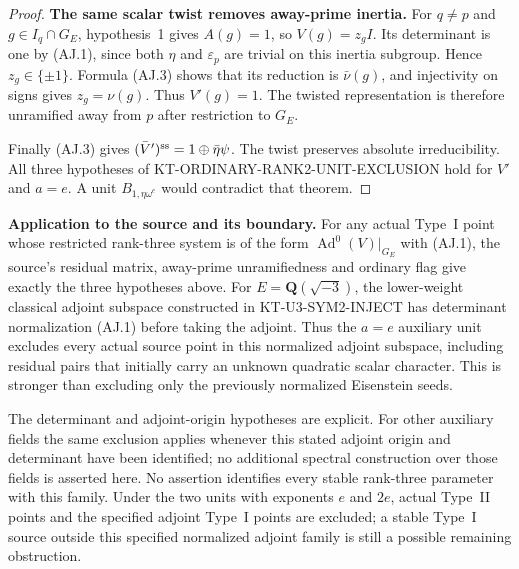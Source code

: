 \documentclass[11pt,a4paper]{article}
\theoremstyle{definition}
\renewcommand{\paragraph}[1]{\par\smallskip\noindent\textbf{#1}\quad\ignorespaces}
\begin{document}
\begin{proof}
\paragraph{The same scalar twist removes away-prime inertia.}
For $q\ne p$ and $g\in I_q\cap G_E$,
hypothesis~1 gives $A(g)=1$, so $V(g)=z_g I$.
Its determinant is one by (AJ.1), since both
$\eta$ and $\varepsilon_p$ are trivial on
this inertia subgroup.  Hence $z_g\in\{\pm1\}$.
Formula (AJ.3) shows that its reduction is
$\bar\nu(g)$, and injectivity on signs gives
$z_g=\nu(g)$.  Thus $V'(g)=1$.
The twisted representation is therefore
unramified away from $p$ after restriction
to $G_E$.

Finally (AJ.3) gives
$(\bar V')^{\rm ss}=1\oplus\bar\eta\psi$.
The twist preserves absolute irreducibility.
All three hypotheses of
KT-ORDINARY-RANK2-UNIT-EXCLUSION hold for
$V'$ and $a=e$.  A unit $B_{1,\eta\omega^e}$
would contradict that theorem.
\end{proof}

\paragraph{Application to the source and its boundary.}
For any actual Type~I point whose restricted
rank-three system is of the form
$\operatorname{Ad}^0(V)|_{G_E}$ with (AJ.1),
the source's residual matrix, away-prime
unramifiedness and ordinary flag give exactly
the three hypotheses above.  For
$E=\mathbf Q(\sqrt{-3})$, the lower-weight
classical adjoint subspace constructed in
KT-U3-SYM2-INJECT has determinant normalization
(AJ.1) before taking the adjoint.  Thus the
$a=e$ auxiliary unit excludes every actual
source point in this normalized adjoint
subspace, including residual pairs that
initially carry an unknown quadratic scalar
character.  This is stronger than excluding
only the previously normalized Eisenstein
seeds.

The determinant and adjoint-origin hypotheses
are explicit.  For other auxiliary fields the
same exclusion applies whenever this stated
adjoint origin and determinant have been
identified; no additional spectral construction
over those fields is asserted here.
No assertion identifies every
stable rank-three parameter with this family.
Under the two units with exponents $e$ and
$2e$, actual Type~II points and the specified
adjoint Type~I points are excluded; a
stable Type~I source outside this specified
normalized adjoint family is still a possible
remaining obstruction.

\end{document}

